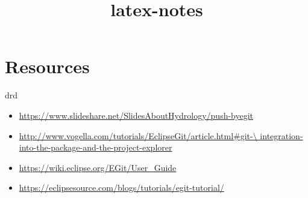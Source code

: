 \documentclass{report}
\title{latex-notes}
\begin{document}
\tableofcontents




\part{Resources}
drd
\begin{itemize}
  \item \url{https://www.slideshare.net/SlidesAboutHydrology/push-byegit}
  \item \url{http://www.vogella.com/tutorials/EclipseGit/article.html#git-\
  integration-into-the-package-and-the-project-explorer}
  \item \url{https://wiki.eclipse.org/EGit/User_Guide}
  \item \url{https://eclipsesource.com/blogs/tutorials/egit-tutorial/}
\end{itemize}
\end{document}

